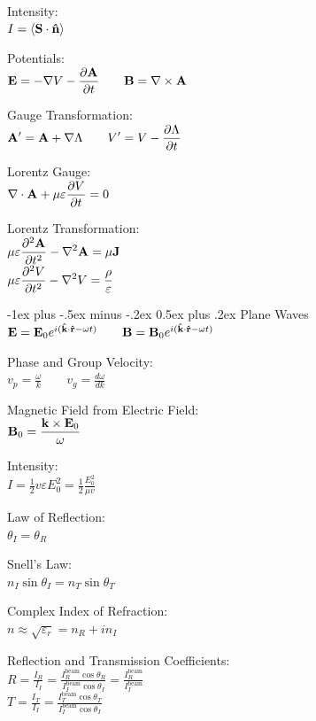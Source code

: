 \documentclass[12pt,landscape]{article}
\makeatletter
\renewcommand{\section}{\@startsection{section}{1}{0mm}%
                                {-1ex plus -.5ex minus -.2ex}%
                                {0.5ex plus .2ex}%
                                {\normalfont\normalsize\bfseries}}
\newcommand{\tab}{\hspace{.02\textwidth}}
\newcommand{\ds}{\displaystyle}
\renewcommand{\dv}[2]{\frac{d#1}{d#2}}
\renewcommand{\grad}{\nabla}
\renewcommand{\curl}[1]{\nabla\times#1}
\renewcommand{\div}[1]{\nabla\cdot#1}
\renewcommand{\cross}{\times}
\makeatother
\begin{document}
\begin{multicols}{3}
Intensity:\\
\tab $I = \langle \vb{S}\cdot\vu{n}\rangle$

Potentials:\\
\tab $\ds \vb{E} = -\grad{V} - \pdv{\vb{A}}{t} \qquad \vb{B} = \curl{\vb{A}}$

Gauge Transformation:\\
\tab $\ds \vb{A^\prime} = \vb{A} + \grad{\Lambda} \qquad V^\prime = V - \pdv{\Lambda}{t}$

Lorentz Gauge:\\
\tab $\ds \div{\vb{A}} + \mu\varepsilon\pdv{V}{t} = 0$

Lorentz Transformation:\\
\tab $\ds \mu\varepsilon\pdv[2]{\vb{A}}{t} - \laplacian{\vb{A}} = \mu\vb{J}$\\
\tab $\ds \mu\varepsilon\pdv[2]{V}{t} - \laplacian{V} = \frac{\rho}{\varepsilon}$

\section{Plane Waves}
$\vb{E} = \vb{E}_0e^{i(\vu{k}\cdot\vu{r} - \omega t)} \qquad \vb{B} = \vb{B}_0e^{i(\vu{k}\cdot\vu{r} - \omega t)}$

Phase and Group Velocity:\\
\tab $\ds v_p = \frac{\omega}{k} \qquad \ds v_g = \dv{\omega}{k}$

\columnbreak

Magnetic Field from Electric Field:\\
\tab $\ds \vb{B}_0 = \frac{\vb{k}\cross\vb{E}_0}{\omega}$

Intensity:\\
\tab $\ds I = \frac{1}{2}v\varepsilon E_0^2 = \frac{1}{2}\frac{E_0^2}{\mu v}$

Law of Reflection:\\
\tab $\theta_I = \theta_R$

Snell's Law:\\
\tab $n_I \sin\theta_I = n_T\sin\theta_T$

Complex Index of Refraction:\\
\tab $\ds n \approx \sqrt{\varepsilon_r} = n_R + in_I$

Reflection and Transmission Coefficients:\\
\tab $\ds R = \frac{I_R}{I_I} = \frac{I^\text{beam}_R\cos\theta_R}{I^\text{beam}_I\cos\theta_I} =\frac{I^\text{beam}_R}{I^\text{beam}_I}$\\
\tab $\ds T = \frac{I_T}{I_I} = \frac{I^\text{beam}_T\cos\theta_T}{I^\text{beam}_I\cos\theta_I}$


\end{multicols}
\end{document}
